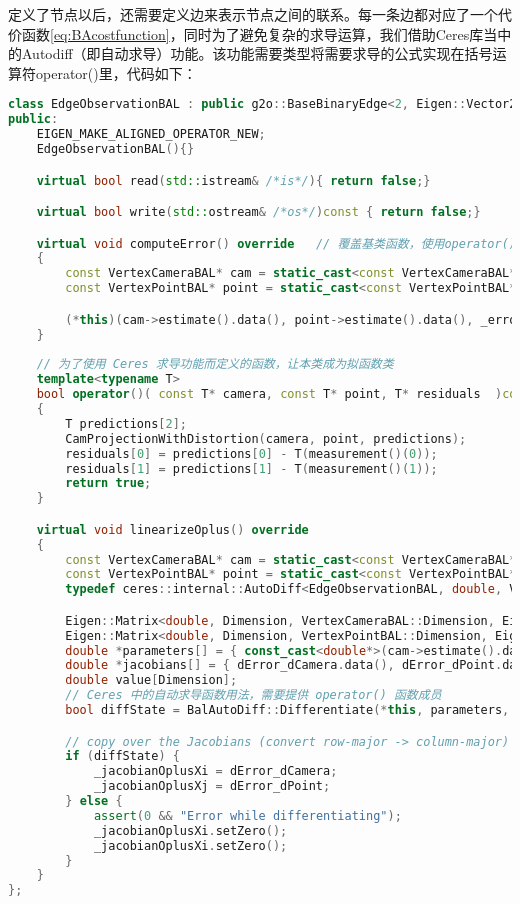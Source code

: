 定义了节点以后，还需要定义边来表示节点之间的联系。每一条边都对应了一个代价函数\eqref{eq:BAcostfunction}，同时为了避免复杂的求导运算，我们借助Ceres库当中的Autodiff（即自动求导）功能。该功能需要类型将需要求导的公式实现在括号运算符operator()里，代码如下：
\enlargethispage{4pt}
\begin{lstlisting}[language=c++,caption=slambook/ch10/g2o_custombundle/g2o_bal_class.h]
class EdgeObservationBAL : public g2o::BaseBinaryEdge<2, Eigen::Vector2d,VertexCameraBAL, VertexPointBAL>{
public:
	EIGEN_MAKE_ALIGNED_OPERATOR_NEW;
	EdgeObservationBAL(){}

	virtual bool read(std::istream& /*is*/){ return false;}

	virtual bool write(std::ostream& /*os*/)const { return false;}

	virtual void computeError() override   // 覆盖基类函数，使用operator()计算代价函数
	{
		const VertexCameraBAL* cam = static_cast<const VertexCameraBAL*>(vertex(0));
		const VertexPointBAL* point = static_cast<const VertexPointBAL*>(vertex(1));

		(*this)(cam->estimate().data(), point->estimate().data(), _error.data());
	}
	
	// 为了使用 Ceres 求导功能而定义的函数，让本类成为拟函数类
	template<typename T>
	bool operator()( const T* camera, const T* point, T* residuals  )const 
	{
		T predictions[2];
		CamProjectionWithDistortion(camera, point, predictions);
		residuals[0] = predictions[0] - T(measurement()(0));
		residuals[1] = predictions[1] - T(measurement()(1));
		return true;
	}

	virtual void linearizeOplus() override
	{
		const VertexCameraBAL* cam = static_cast<const VertexCameraBAL*>(vertex(0));
		const VertexPointBAL* point = static_cast<const VertexPointBAL*>(vertex(1));
		typedef ceres::internal::AutoDiff<EdgeObservationBAL, double, VertexCameraBAL::Dimension, VertexPointBAL::Dimension> BalAutoDiff;

		Eigen::Matrix<double, Dimension, VertexCameraBAL::Dimension, Eigen::RowMajor> dError_dCamera;
		Eigen::Matrix<double, Dimension, VertexPointBAL::Dimension, Eigen::RowMajor> dError_dPoint;
		double *parameters[] = { const_cast<double*>(cam->estimate().data()), const_cast<double*>(point->estimate().data()) };
		double *jacobians[] = { dError_dCamera.data(), dError_dPoint.data() };
		double value[Dimension];
		// Ceres 中的自动求导函数用法，需要提供 operator() 函数成员
		bool diffState = BalAutoDiff::Differentiate(*this, parameters, Dimension, value, jacobians);  

		// copy over the Jacobians (convert row-major -> column-major)
		if (diffState) {
			_jacobianOplusXi = dError_dCamera;
			_jacobianOplusXj = dError_dPoint;
		} else {
			assert(0 && "Error while differentiating");
			_jacobianOplusXi.setZero();
			_jacobianOplusXi.setZero();
		}
	}
};
\end{lstlisting}

